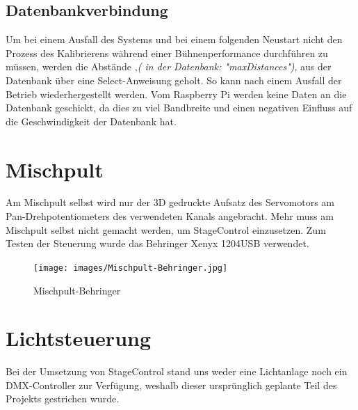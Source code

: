\subsection{Datenbankverbindung}
Um bei einem Ausfall des Systems und bei einem folgenden Neustart nicht den Prozess des Kalibrierens während einer Bühnenperformance durchführen zu müssen, werden die Abstände ,\textit{( in der Datenbank: "maxDistances")}, aus der Datenbank über eine Select-Anweisung geholt. So kann nach einem Ausfall der Betrieb wiederhergestellt werden. Vom Raspberry Pi werden keine Daten an die Datenbank geschickt, da dies zu viel Bandbreite und einen negativen Einfluss auf die Geschwindigkeit der Datenbank hat.

\newpage
\section{Mischpult}
Am Mischpult selbst wird nur der 3D gedruckte Aufsatz des Servomotors am Pan-Drehpotentiometers des verwendeten Kanals angebracht. Mehr muss am Mischpult selbst nicht gemacht werden, um StageControl einzusetzen. Zum Testen der Steuerung wurde das Behringer Xenyx 1204USB verwendet.


\begin{figure}[H]
	\centering
	\texttt{[image: images/Mischpult-Behringer.jpg]}
	\caption[Mischpult-Behringer]{Mischpult-Behringer}
	\label{fig: Mischpult-Behringer}
\end{figure}


\section{Lichtsteuerung}
Bei der Umsetzung von StageControl stand uns weder eine Lichtanlage noch ein DMX-Controller zur Verfügung, weshalb dieser ursprünglich geplante Teil des Projekts gestrichen wurde.
